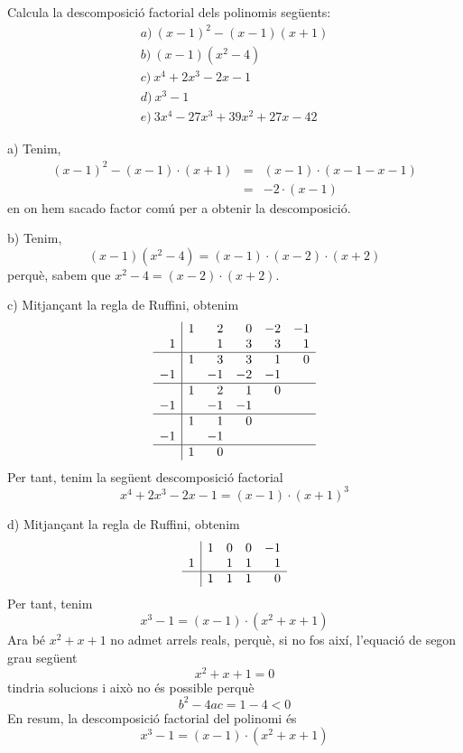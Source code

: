 \begin{exercici}
Calcula la descomposició factorial dels polinomis següents:\[
\begin{array}{l}
a)~(x-1)^{2}-(x-1)(x+1) \\
b)~(x-1)(x^{2}-4) \\
c)~x^{4}+2x^{3}-2x-1 \\
d)~x^{3}-1 \\
e)~3x^{4}-27x^{3}+39x^{2}+27x-42\end{array}\]
\end{exercici}

\begin{solucio}
a) Tenim,\begin{eqnarray*}
(x-1)^{2}-(x-1)\cdot (x+1) &=&(x-1)\cdot \left( x-1-x-1\right) \\
&=&-2\cdot (x-1)
\end{eqnarray*}en on hem sacado factor comú per a obtenir la descomposició.

b) Tenim,\[
(x-1)(x^{2}-4)=(x-1)\cdot (x-2)\cdot (x+2)
\]perquè, sabem que $x^{2}-4=(x-2)\cdot (x+2)$.

c) Mitjançant la regla de Ruffini, obtenim\[
\begin{array}{r|rrrrr}
& 1 & 2 & 0 & -2 & -1 \\
1 & & 1 & 3 & 3 & 1 \\\hline
& 1 & 3 & 3 & 1 & 0 \\
-1 & & -1 & -2 & -1 & \\\hline
& 1 & 2 & 1 & 0 & \\
-1 & & -1 & -1 & & \\\hline
& 1 & 1 & 0 & & \\
-1 & & -1 & & & \\\hline
 & 1 & 0 & & &
\end{array}\]Per tant, tenim la següent descomposició factorial\[
x^{4}+2x^{3}-2x-1=(x-1)\cdot (x+1)^{3}
\]

d) Mitjançant la regla de Ruffini, obtenim\[
\begin{array}{r|rrrr}
& 1 & 0 & 0 & -1 \\
1 & & 1 & 1 & 1 \\\hline
& 1 & 1 & 1 & 0\end{array}\]Per tant, tenim\[
x^{3}-1=(x-1)\cdot (x^{2}+x+1)
\]Ara bé $x^{2}+x+1$ no admet arrels reals, perquè, si no fos així,
l'equació de segon grau següent\[
x^{2}+x+1=0
\]tindria solucions i això no és possible perquè\[
b^{2}-4ac=1-4<0
\]En resum, la descomposició factorial del polinomi és\[
x^{3}-1=(x-1)\cdot (x^{2}+x+1)
\]


\end{solucio}
